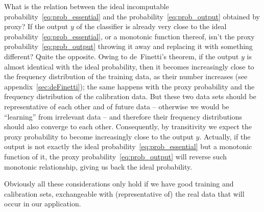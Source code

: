 \documentclass[a4paper,12pt,%
onecolumn,oneside,article,%
british%
]{memoir}
\makeatletter
\def\sum{\DOTSI\sumop\slimits@}
\newcommand*{\amp}{\&}
\newcommand*{\pencil}{{\fontencoding{U}\fontfamily{fontawesometwo}\selectfont\symbol{210}}}
\newcommand{\mynotep}[1]{{\footnotesize\color{notecolour}\pencil\ #1}}
\renewcommand*{\P}{\mathrm{P}}%
\renewcommand*{\|}[1][]{\nonscript\:#1\vert\nonscript\:\mathopen{}}
\newcommand*{\texts}[1]{\text{\small #1}}
\makeatother
\begin{document}
What is the relation between the ideal incomputable probability~\eqref{eq:prob_essential} and the probability~\eqref{eq:prob_output} obtained by proxy? If the output $y$ of the classifier is already very close to the ideal probability~\eqref{eq:prob_essential}, or a monotonic function thereof, isn't the proxy probability~\eqref{eq:prob_output} throwing it away and replacing it with something different? Quite the opposite. Owing to de~Finetti's theorem, if the output $y$ is almost identical with the ideal probability, then it becomes increasingly close to the frequency distribution of the training data, as their number increases (see appendix~\ref{sec:deFinetti}); the same happens with the proxy probability and the frequency distribution of the calibration data. But these two data sets should be representative of each other and of future data -- otherwise we would be \enquote{learning} from irrelevant data -- and therefore their frequency distributions should also converge to each other. Consequently, by transitivity we expect the proxy probability to become increasingly close to the output $y$. Actually, if the output is not exactly the ideal probability~\eqref{eq:prob_essential} but a monotonic function of it, the proxy probability~\eqref{eq:prob_output} will reverse such monotonic relationship, giving us back the ideal probability.

Obviously all these considerations only hold if we have good training and calibration sets, exchangeable with (representative of) the real data that will occur in our application.

\end{document}
